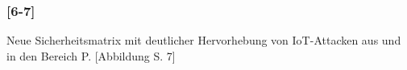 \documentclass[11pt, a4paper, onecolumn, oneside, toc=bibliographynumbered, liststotoc]{scrartcl} %
\begin{document}
			\subsubsection*{[6-7]}
Neue Sicherheitsmatrix mit deutlicher Hervorhebung von IoT-Attacken aus und in den Bereich P. [Abbildung S. 7]			
				


	


\end{document}
